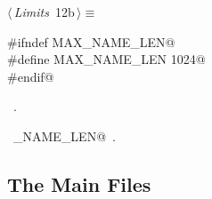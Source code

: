 \documentclass[a4paper]{report}
\begin{document}
\begin{flushleft} \small
\begin{minipage}{\linewidth}\label{scrap4}\raggedright\small
{} $\langle\,${\it Limits}\nobreak\ {\footnotesize {12b}}$\,\rangle\equiv$
\vspace{-1ex}
\begin{list}{}{} \item
\mbox{}\verb@#ifndef MAX_NAME_LEN@\\
\mbox{}\verb@#define MAX_NAME_LEN 1024@\\
\mbox{}\verb@#endif@\\
\mbox{}\verb@@{\NWsep}
\end{list}
\vspace{-1.5ex}
\footnotesize
\begin{list}{}{\setlength{\itemsep}{-\parsep}\setlength{\itemindent}{-\leftmargin}}
\item \NWtxtMacroRefIn\ .
\item \NWtxtIdentsDefed\nobreak\  \verb@MAX_NAME_LEN@\nobreak\ .
\item{}
\end{list}
\end{minipage}\vspace{4ex}
\end{flushleft}
\subsection{The Main Files}
\end{document}
